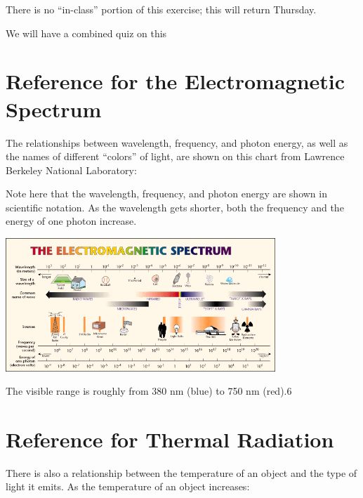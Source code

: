 \documentclass[12pt]{article}
\begin{document}
\Large
\centerline{}

\normalsize
\begin{center}
	There is no ``in-class'' portion of this exercise; this will return Thursday. \bigskip
	
	We will have a combined quiz on this 
\end{center}

\bigskip

\section{Reference for the Electromagnetic Spectrum}

The relationships between wavelength, frequency, and photon energy, as well as the names of different ``colors'' of light, are shown on this chart from Lawrence Berkeley National Laboratory:

\begin{minipage}{0.35\textwidth}
	Note here that the wavelength, frequency, and photon energy are shown in scientific notation. As the wavelength gets shorter, both the frequency and the energy of one photon increase.
	\end{minipage}
\hspace{0.05\textwidth}
\begin{minipage}{0.\textwidth}
\begin{center}
	\includegraphics[width=4in]{EMSpec.png}
\end{center}
	\end{minipage}


The visible range is roughly from 380 nm (blue) to 750 nm (red).6

\section{Reference for Thermal Radiation}

There is also a relationship between the temperature of an object and the type of light it emits. As the temperature of an object increases:
\end{document}
